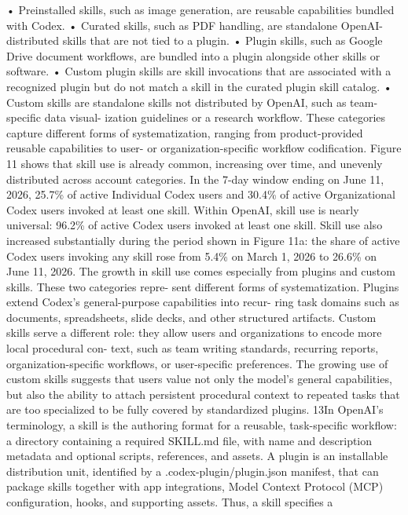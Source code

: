 • Preinstalled skills, such as image generation, are reusable capabilities bundled with Codex.
• Curated skills, such as PDF handling, are standalone OpenAI-distributed skills that are not tied to
a plugin.
• Plugin skills, such as Google Drive document workflows, are bundled into a plugin alongside other
skills or software.
• Custom plugin skills are skill invocations that are associated with a recognized plugin but do not
match a skill in the curated plugin skill catalog.
• Custom skills are standalone skills not distributed by OpenAI, such as team-specific data visual-
ization guidelines or a research workflow.
These categories capture different forms of systematization, ranging from product-provided reusable
capabilities to user- or organization-specific workflow codification.
Figure 11 shows that skill use is already common, increasing over time, and unevenly distributed
across account categories. In the 7-day window ending on June 11, 2026, 25.7\% of active Individual
Codex users and 30.4\% of active Organizational Codex users invoked at least one skill. Within OpenAI,
skill use is nearly universal: 96.2\% of active Codex users invoked at least one skill. Skill use also increased
substantially during the period shown in Figure 11a: the share of active Codex users invoking any skill
rose from 5.4\% on March 1, 2026 to 26.6\% on June 11, 2026.
The growth in skill use comes especially from plugins and custom skills. These two categories repre-
sent different forms of systematization. Plugins extend Codex’s general-purpose capabilities into recur-
ring task domains such as documents, spreadsheets, slide decks, and other structured artifacts. Custom
skills serve a different role: they allow users and organizations to encode more local procedural con-
text, such as team writing standards, recurring reports, organization-specific workflows, or user-specific
preferences. The growing use of custom skills suggests that users value not only the model’s general
capabilities, but also the ability to attach persistent procedural context to repeated tasks that are too
specialized to be fully covered by standardized plugins.
13In OpenAI’s terminology, a skill is the authoring format for a reusable, task-specific workflow: a directory containing a
required SKILL.md file, with name and description metadata and optional scripts, references, and assets. A plugin is
an installable distribution unit, identified by a .codex-plugin/plugin.json manifest, that can package skills together
with app integrations, Model Context Protocol (MCP) configuration, hooks, and supporting assets. Thus, a skill specifies a
